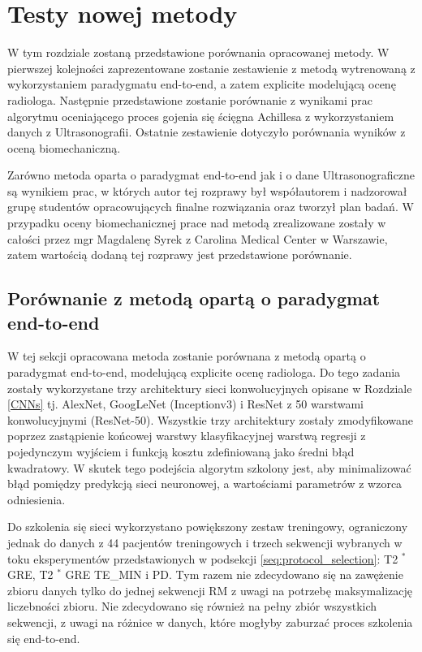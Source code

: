 \chapter{Testy nowej metody}

W tym rozdziale zostaną przedstawione porównania opracowanej metody. W pierwszej kolejności zaprezentowane zostanie zestawienie z metodą wytrenowaną z wykorzystaniem paradygmatu end-to-end, a zatem explicite modelującą ocenę radiologa. Następnie przedstawione zostanie porównanie z wynikami prac algorytmu oceniającego proces gojenia się ścięgna Achillesa z wykorzystaniem danych z Ultrasonografii. Ostatnie zestawienie dotyczyło porównania wyników z oceną biomechaniczną.

Zarówno metoda oparta o paradygmat end-to-end jak i o dane Ultrasonograficzne są wynikiem prac, w których autor tej rozprawy był współautorem i nadzorował grupę studentów opracowujących finalne rozwiązania oraz tworzył plan badań. W przypadku oceny biomechanicznej prace nad metodą zrealizowane zostały w całości przez mgr Magdalenę Syrek z Carolina Medical Center w Warszawie, zatem wartością dodaną tej rozprawy jest przedstawione porównanie.   

\section{Porównanie z metodą opartą o paradygmat end-to-end}

W tej sekcji opracowana metoda zostanie porównana z metodą opartą o paradygmat end-to-end, modelującą explicite ocenę radiologa. Do tego zadania zostały wykorzystane trzy architektury sieci konwolucyjnych opisane w Rozdziale \ref{CNNs} tj. AlexNet, GoogLeNet (Inceptionv3) i ResNet z 50 warstwami konwolucyjnymi (ResNet-50). Wszystkie trzy architektury zostały zmodyfikowane poprzez zastąpienie końcowej warstwy klasyfikacyjnej warstwą regresji z pojedynczym wyjściem i funkcją kosztu zdefiniowaną jako średni błąd kwadratowy. W skutek tego podejścia algorytm szkolony jest, aby minimalizować błąd pomiędzy predykcją sieci neuronowej, a wartościami parametrów z wzorca odniesienia. 

Do szkolenia się sieci wykorzystano powiększony zestaw treningowy, ograniczony jednak do danych z 44 pacjentów treningowych i trzech sekwencji wybranych w toku eksperymentów przedstawionych w podsekcji \ref{seq:protocol_selection}: T2 $^\ast$ GRE, T2 $^\ast$ GRE TE\_MIN i PD. Tym razem nie zdecydowano się na zawężenie zbioru danych tylko do jednej sekwencji RM z uwagi na potrzebę maksymalizację liczebności zbioru. Nie zdecydowano się również na pełny zbiór wszystkich sekwencji, z uwagi na różnice w danych, które mogłyby zaburzać proces szkolenia się end-to-end. 

